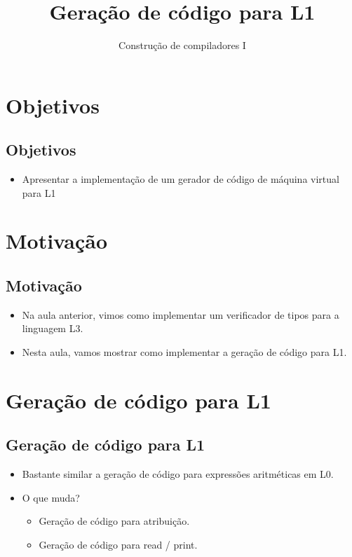 \documentclass[11pt]{article}
\author{Construção de compiladores I}
\date{}
\title{Geração de código para L1}
\begin{document}
\maketitle
\section*{Objetivos}
\label{sec:orgbf6b58d}

\subsection*{Objetivos}
\label{sec:orge7b32b0}

\begin{itemize}
\item Apresentar a implementação de um gerador de código de máquina virtual para L1
\end{itemize}
\section*{Motivação}
\label{sec:org4cb216b}

\subsection*{Motivação}
\label{sec:org7971f03}

\begin{itemize}
\item Na aula anterior, vimos como implementar um verificador de tipos para a linguagem L3.

\item Nesta aula, vamos mostrar como implementar a geração de código para L1.
\end{itemize}
\section*{Geração de código para L1}
\label{sec:orgc36eb20}

\subsection*{Geração de código para L1}
\label{sec:org90651ee}

\begin{itemize}
\item Bastante similar a geração de código para expressões aritméticas em L0.

\item O que muda?
\begin{itemize}
\item Geração de código para atribuição.
\item Geração de código para read / print.
\end{itemize}
\end{itemize}
\end{document}
